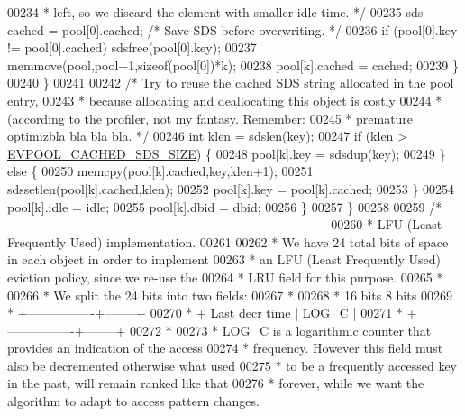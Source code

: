 \begin{DoxyCode}
00234 \textcolor{comment}{                 * left, so we discard the element with smaller idle time. */}
00235                 sds cached = pool[0].cached; \textcolor{comment}{/* Save SDS before overwriting. */}
00236                 \textcolor{keywordflow}{if} (pool[0].key != pool[0].cached) sdsfree(pool[0].key);
00237                 memmove(pool,pool+1,\textcolor{keyword}{sizeof}(pool[0])*k);
00238                 pool[k].cached = cached;
00239             \}
00240         \}
00241 
00242         \textcolor{comment}{/* Try to reuse the cached SDS string allocated in the pool entry,}
00243 \textcolor{comment}{         * because allocating and deallocating this object is costly}
00244 \textcolor{comment}{         * (according to the profiler, not my fantasy. Remember:}
00245 \textcolor{comment}{         * premature optimizbla bla bla bla. */}
00246         \textcolor{keywordtype}{int} klen = sdslen(key);
00247         \textcolor{keywordflow}{if} (klen > \hyperlink{evict_8c_acfb2106a0b0fb572e25c170d78ab1729}{EVPOOL\_CACHED\_SDS\_SIZE}) \{
00248             pool[k].key = sdsdup(key);
00249         \} \textcolor{keywordflow}{else} \{
00250             memcpy(pool[k].cached,key,klen+1);
00251             sdssetlen(pool[k].cached,klen);
00252             pool[k].key = pool[k].cached;
00253         \}
00254         pool[k].idle = idle;
00255         pool[k].dbid = dbid;
00256     \}
00257 \}
00258 
00259 \textcolor{comment}{/* ----------------------------------------------------------------------------}
00260 \textcolor{comment}{ * LFU (Least Frequently Used) implementation.}
00261 \textcolor{comment}{}
00262 \textcolor{comment}{ * We have 24 total bits of space in each object in order to implement}
00263 \textcolor{comment}{ * an LFU (Least Frequently Used) eviction policy, since we re-use the}
00264 \textcolor{comment}{ * LRU field for this purpose.}
00265 \textcolor{comment}{ *}
00266 \textcolor{comment}{ * We split the 24 bits into two fields:}
00267 \textcolor{comment}{ *}
00268 \textcolor{comment}{ *          16 bits      8 bits}
00269 \textcolor{comment}{ *     +----------------+--------+}
00270 \textcolor{comment}{ *     + Last decr time | LOG\_C  |}
00271 \textcolor{comment}{ *     +----------------+--------+}
00272 \textcolor{comment}{ *}
00273 \textcolor{comment}{ * LOG\_C is a logarithmic counter that provides an indication of the access}
00274 \textcolor{comment}{ * frequency. However this field must also be decremented otherwise what used}
00275 \textcolor{comment}{ * to be a frequently accessed key in the past, will remain ranked like that}
00276 \textcolor{comment}{ * forever, while we want the algorithm to adapt to access pattern changes.}

\end{DoxyCode}
